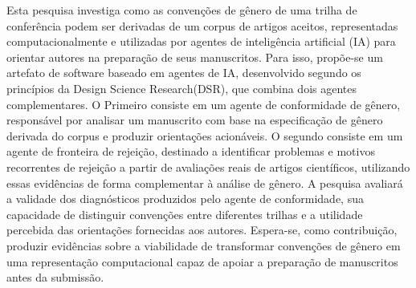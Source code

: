 Esta pesquisa investiga como as convenções de gênero de uma trilha de conferência podem ser derivadas de um corpus de artigos aceitos, representadas computacionalmente e utilizadas por agentes de inteligência artificial (IA) para orientar autores na preparação de seus manuscritos. Para isso, propõe-se um artefato de software baseado em agentes de IA, desenvolvido segundo os princípios da Design Science Research(DSR), que combina dois agentes complementares. O Primeiro consiste em um agente de conformidade de gênero, responsável por analisar um manuscrito com base na especificação de gênero derivada do corpus e produzir orientações acionáveis. O segundo consiste em um agente de fronteira de rejeição, destinado a identificar problemas e motivos recorrentes de rejeição a partir de avaliações reais de artigos científicos, utilizando essas evidências de forma complementar à análise de gênero. A pesquisa avaliará a validade dos diagnósticos produzidos pelo agente de conformidade, sua capacidade de distinguir convenções entre diferentes trilhas e a utilidade percebida das orientações fornecidas aos autores. Espera-se, como contribuição, produzir evidências sobre a viabilidade de transformar convenções de gênero em uma representação computacional capaz de apoiar a preparação de manuscritos antes da submissão.

